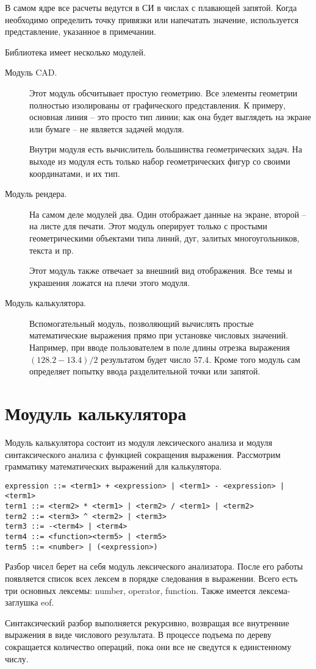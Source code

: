 \documentclass[a4paper, 12pt]{article}
\begin{document}
В самом ядре все расчеты ведутся в СИ в числах с плавающей запятой. Когда необходимо
определить точку привязки или напечатать значение, используется представление,
указанное в примечании.

Библиотека имеет несколько модулей.

\begin{description}
  \item[Модуль CAD.] Этот модуль обсчитывает простую геометрию. Все элементы геометрии
  полностью изолированы от графического представления. К примеру, основная линия -- это
  просто тип линии; как она будет выглядеть на экране или бумаге -- не является задачей
  модуля.

  Внутри модуля есть вычислитель большинства геометрических задач. На выходе из модуля
  есть только набор геометрических фигур со своими координатами, и их тип.

  \item[Модуль рендера.] На самом деле модулей два. Один отображает данные на экране,
  второй -- на листе для печати. Этот модуль оперирует только с простыми
  геометрическими объектами типа линий, дуг, залитых многоугольников, текста и пр.

  Этот модуль также отвечает за внешний вид отображения. Все темы и украшения ложатся
  на плечи этого модуля.

  \item[Модуль калькулятора.] Вспомогательный модуль, позволяющий вычислять простые
  математические выражения прямо при установке числовых значений. Например, при вводе
  пользователем в поле длины отрезка выражения $(128.2-13.4)/2$ результатом будет
  число $57.4$. Кроме того модуль сам определяет попытку ввода разделительной точки
  или запятой.
\end{description}

\section{Моудуль калькулятора}
Модуль калькулятора состоит из модуля лексического анализа и модуля синтаксического
анализа с функцией сокращения выражения. Рассмотрим грамматику математических выражений
для калькулятора.

\begin{verbatim}
expression ::= <term1> + <expression> | <term1> - <expression> | <term1>
term1 ::= <term2> * <term1> | <term2> / <term1> | <term2>
term2 ::= <term3> ^ <term2> | <term3>
term3 ::= -<term4> | <term4>
term4 ::= <function><term5> | <term5>
term5 ::= <number> | (<expression>)
\end{verbatim}

Разбор чисел берет на себя модуль лексического анализатора. После его работы
появляется список всех лексем в порядке следования в выражении. Всего есть
три основных лексемы: number, operator, function. Также имеется лексема-заглушка
eof.

Синтаксический разбор выполняется рекурсивно, возвращая все внутренние выражения
в виде числового результата. В процессе подъема по дереву сокращается количество
операций, пока они все не сведутся к единстенному числу.
\end{document}
